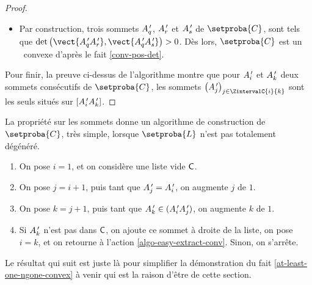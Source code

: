 \begin{proof}
\begin{itemize}
        \item Par construction, trois sommets  $A^{\,\prime}_q$, $A^{\,\prime}_r$ et $A^{\,\prime}_s$ de $\setproba{C}$, sont tels que $\det \big( \vect{\primeit{A}_q \primeit{A}_{r}}, \vect{\primeit{A}_q \primeit{A}_s} \big) > 0$.
        Dès lors, $\setproba{C}$ est un \kgone\ convexe d'après le fait \ref{conv-pos-det}.
    \end{itemize}

	
	Pour finir, la preuve ci-dessus de l'algorithme montre que pour $A^{\,\prime}_i$ et $A^{\,\prime}_k$ deux sommets consécutifs de $\setproba{C}$, les sommets $\big( \primeit{A}_j \big)_{ j \in \ZintervalC{i}{k} }$ sont les seuls situés sur $[A^{\,\prime}_i A^{\,\prime}_k]$.
\end{proof}


\begin{remark}
    La propriété sur les sommets donne un algorithme de construction de $\setproba{C}$, très simple, lorsque $\setproba{L}$ n'est pas totalement dégénéré.
    \begin{enumerate}[label=\fbox{\small\bfseries\textsf{A\kern.25pt\arabic*}}]
        \item On pose $i = 1$, et on considère une liste vide $\mathsf{C}$.

        \item \label{algo-easy-extract-conv}
              On pose $j = i + 1$,
              puis
              tant que $A^{\,\prime}_j = A^{\,\prime}_i$, on augmente $j$ de $1$.

        \item On pose $k = j + 1$,
              puis
              tant que $A^{\,\prime}_k \in (A^{\,\prime}_i A^{\,\prime}_j)$, on augmente $k$ de $1$.

        \item Si $A^{\,\prime}_k$ n'est pas dans $\mathsf{C}$, on ajoute ce sommet à droite de la liste, on pose $i = k$, et on retourne à l'action \ref{algo-easy-extract-conv}. Sinon, on s'arrête.
    \end{enumerate}
\end{remark}




%

Le résultat qui suit est juste là pour simplifier la démonstration du fait \ref{at-least-one-ngone-convex} à venir qui est la raison d'être de cette section.


